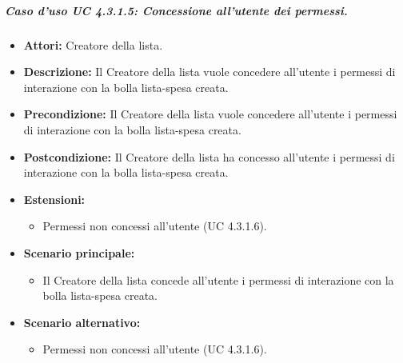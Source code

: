 \subparagraph{Caso d'uso UC 4.3.1.5: Concessione all'utente dei permessi.}
\label{Caso d'uso UC 4.3.1.5: Concessione all'utente dei permessi.}

\FloatBarrier
\begin{itemize}
\item \textbf{Attori:} Creatore della lista.
\item \textbf{Descrizione:} Il Creatore della lista vuole concedere all'utente i permessi di interazione con la bolla lista-spesa creata.
\item \textbf{Precondizione:} Il Creatore della lista vuole concedere all'utente i permessi di interazione con la bolla lista-spesa creata. 
\item \textbf{Postcondizione:} Il Creatore della lista ha concesso all'utente i permessi di interazione con la bolla lista-spesa creata.
\item \textbf{Estensioni:}
	\begin{itemize}
	\item{Permessi non concessi all'utente (UC 4.3.1.6).}
	\end{itemize}
\item \textbf{Scenario principale:}
\begin{itemize}
\item Il Creatore della lista concede all'utente i permessi di interazione con la bolla lista-spesa creata.
\end{itemize}
\item \textbf{Scenario alternativo:}
\begin{itemize}
\item Permessi non concessi all'utente (UC 4.3.1.6).
\end{itemize}
\end{itemize}